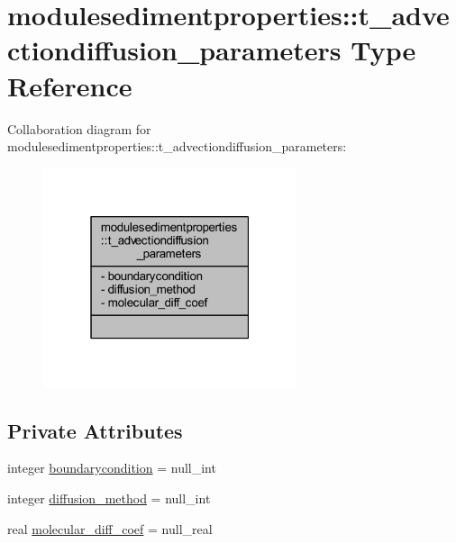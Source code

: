 \hypertarget{structmodulesedimentproperties_1_1t__advectiondiffusion__parameters}{}\section{modulesedimentproperties\+:\+:t\+\_\+advectiondiffusion\+\_\+parameters Type Reference}
\label{structmodulesedimentproperties_1_1t__advectiondiffusion__parameters}


Collaboration diagram for modulesedimentproperties\+:\+:t\+\_\+advectiondiffusion\+\_\+parameters\+:\nopagebreak
\begin{figure}[H]
\begin{center}
\leavevmode
\includegraphics[width=211pt]{structmodulesedimentproperties_1_1t__advectiondiffusion__parameters__coll__graph}
\end{center}
\end{figure}
\subsection*{Private Attributes}
\begin{DoxyCompactItemize}
\item 
integer \mbox{\hyperlink{structmodulesedimentproperties_1_1t__advectiondiffusion__parameters_aa429d932599a6e857ae47e32297fe0c5}{boundarycondition}} = null\+\_\+int
\item 
integer \mbox{\hyperlink{structmodulesedimentproperties_1_1t__advectiondiffusion__parameters_a7497b8610779da8aad34767cb5cd5327}{diffusion\+\_\+method}} = null\+\_\+int
\item 
real \mbox{\hyperlink{structmodulesedimentproperties_1_1t__advectiondiffusion__parameters_af41c30f5d3f4529e14cd40a82efe1380}{molecular\+\_\+diff\+\_\+coef}} = null\+\_\+real
\end{DoxyCompactItemize}


